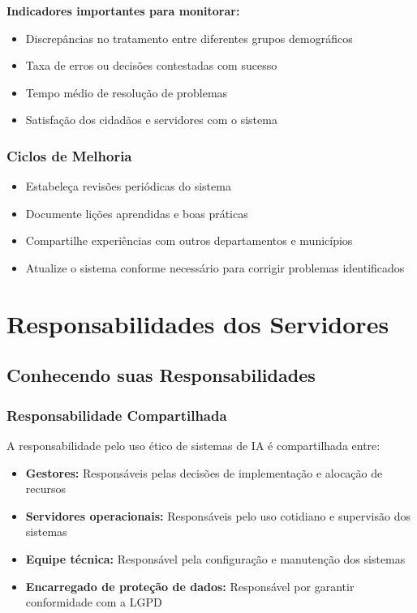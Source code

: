 \documentclass[12pt,a4paper]{article}
\begin{document}
\begin{tcolorbox}[highlight]
\textbf{Indicadores importantes para monitorar:}
\begin{itemize}
    \item Discrepâncias no tratamento entre diferentes grupos demográficos
    \item Taxa de erros ou decisões contestadas com sucesso
    \item Tempo médio de resolução de problemas
    \item Satisfação dos cidadãos e servidores com o sistema
\end{itemize}
\end{tcolorbox}

\subsubsection{Ciclos de Melhoria}
\begin{itemize}
    \item Estabeleça revisões periódicas do sistema
    \item Documente lições aprendidas e boas práticas
    \item Compartilhe experiências com outros departamentos e municípios
    \item Atualize o sistema conforme necessário para corrigir problemas identificados
\end{itemize}

\newpage
\section{Responsabilidades dos Servidores}

\subsection{Conhecendo suas Responsabilidades}

\subsubsection{Responsabilidade Compartilhada}
A responsabilidade pelo uso ético de sistemas de IA é compartilhada entre:

\begin{itemize}
    \item \textbf{Gestores:} Responsáveis pelas decisões de implementação e alocação de recursos
    \item \textbf{Servidores operacionais:} Responsáveis pelo uso cotidiano e supervisão dos sistemas
    \item \textbf{Equipe técnica:} Responsável pela configuração e manutenção dos sistemas
    \item \textbf{Encarregado de proteção de dados:} Responsável por garantir conformidade com a LGPD
\end{itemize}
\end{document}
